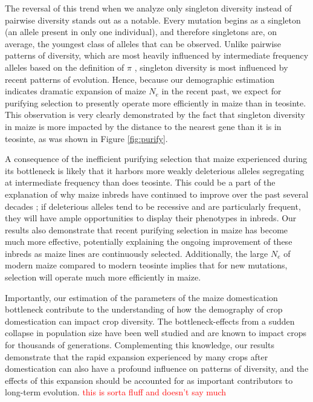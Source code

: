 \documentclass{pnastwo}
\newcommand{\jri}[1]{\textcolor{red}{\scriptsize #1}}
\begin{document}
\begin{article}
The reversal of this trend when we analyze only singleton diversity instead of pairwise diversity stands out as a notable. Every mutation begins as a singleton (an allele present in only one individual), and therefore singletons are, on average, the youngest class of alleles that can be observed. Unlike pairwise patterns of diversity, which are most heavily influenced by intermediate frequency alleles based on the definition of $\pi$ \cite{nei1979}, singleton diversity is most influenced by recent patterns of evolution. Hence, because our demographic estimation indicates dramatic expansion of maize $N_e$ in the recent past, we expect for purifying selection to presently operate more efficiently in maize than in teosinte. This observation is very clearly demonstrated by the fact that singleton diversity in maize is more impacted by the distance to the nearest gene than it is in teosinte, as was shown in Figure \ref{fig:purify}.

A consequence of the inefficient purifying selection that maize experienced during its bottleneck is likely that it harbors more weakly deleterious alleles segregating at intermediate frequency than does teosinte. This could be a part of the explanation of why maize inbreds have continued to improve over the past several decades \cite{meghji1984}; if deleterious alleles tend to be recessive and are particularly frequent, they will have ample opportunities to display their phenotypes in inbreds. Our results also demonstrate that recent purifying selection in maize has become much more effective, potentially explaining the ongoing improvement of these inbreds as maize lines are continuously selected. Additionally, the large $N_e$ of modern maize compared to modern teosinte implies that for new mutations, selection will operate much more efficiently in maize.

 Importantly, our estimation of the parameters of the maize domestication bottleneck contribute to the understanding of how the demography of crop domestication can impact crop diversity. The bottleneck-effects from a sudden collapse in population size have been well studied and are known to impact crops for thousands of generations. Complementing this knowledge, our results demonstrate that the rapid expansion experienced by many crops after domestication can also have a profound influence on patterns of diversity, and the effects of this expansion should be accounted for as important contributors to long-term evolution. \jri{this is sorta fluff and doesn't say much} 


\end{article}
\end{document}
